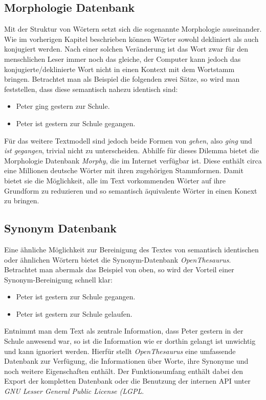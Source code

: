 \subsection{Morphologie Datenbank}
Mit der Struktur von Wörtern setzt sich die sogenannte Morphologie auseinander. Wie im vorherigen Kapitel beschrieben können Wörter sowohl dekliniert als auch konjugiert werden. Nach einer solchen Veränderung ist das Wort zwar für den menschlichen Leser immer noch das gleiche, der Computer kann jedoch das konjugierte/deklinierte Wort nicht in einen Kontext mit dem Wortstamm bringen. Betrachtet man als Beispiel die folgenden zwei Sätze, so wird man feststellen, dass diese semantisch nahezu identisch sind:
\begin{itemize}
\item Peter ging gestern zur Schule.
\item Peter ist gestern zur Schule gegangen.
\end{itemize}
Für das weitere Textmodell sind jedoch beide Formen von \textit{gehen}, also \textit{ging} und \textit{ist gegangen}, trivial nicht zu unterscheiden.
\newline
Abhilfe für dieses Dilemma bietet die Morphologie Datenbank \textit{Morphy}, die im Internet verfügbar ist. Diese enthält circa eine Millionen deutsche Wörter mit ihren zugehörigen Stammformen. Damit bietet sie die Möglichkeit, alle im Text vorkommenden Wörter auf ihre Grundform zu reduzieren und so semantisch äquivalente Wörter in einen Konext zu bringen. 

\subsection{Synonym Datenbank}
Eine ähnliche Möglichkeit zur Bereinigung des Textes von semantisch identischen oder ähnlichen Wörtern bietet die Synonym-Datenbank \textit{OpenThesaurus}. Betrachtet man abermals das Beispiel von oben, so wird der Vorteil einer Synonym-Bereinigung schnell klar:
\begin{itemize}
\item Peter ist gestern zur Schule gegangen.
\item Peter ist gestern zur Schule gelaufen.
\end{itemize}
Entnimmt man dem Text als zentrale Information, dass Peter gestern in der Schule anwesend war, so ist die Information wie er dorthin gelangt ist unwichtig und kann ignoriert werden.
\newline
Hierfür stellt \textit{OpenThesaurus} eine umfassende Datenbank zur Verfügung, die Informationen über Worte, ihre Synonyme und noch weitere Eigenschaften enthält. Der Funktionsumfang enthält dabei den Export der kompletten Datenbank oder die Benutzung der internen API unter \textit{GNU Lesser General Public License (LGPL}.

